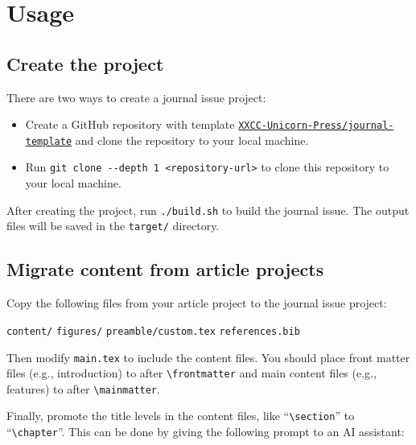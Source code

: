 \chapter{Usage}
\label{chap:usage}

\section{Create the project}

There are two ways to create a journal issue project:
\begin{itemize}
  \item Create a GitHub repository with template \href{https://github.com/XXCC-Unicorn-Press/journal-template}{\texttt{XXCC-Unicorn-Press/journal-template}} and clone the repository to your local machine.
  \item Run \verb|git clone --depth 1 <repository-url>| to clone this repository to your local machine.
\end{itemize}

After creating the project, run \verb|./build.sh| to build the journal issue. The output files will be saved in the \verb|target/| directory.

\section{Migrate content from article projects}

Copy the following files from your article project to the journal issue project:
\begin{center}
  \texttt{content/}
    \hspace{1em}
  \texttt{figures/}
    \hspace{1em}
  \texttt{preamble/custom.tex}
    \hspace{1em}
  \texttt{references.bib}
\end{center}

Then modify \texttt{main.tex} to include the content files. You should place front matter files (e.g., introduction) to after \verb|\frontmatter| and main content files (e.g., features) to after \verb|\mainmatter|.

Finally, promote the title levels in the content files, like ``\verb|\section|'' to ``\verb|\chapter|''.
This can be done by giving the following prompt to an AI assistant:

